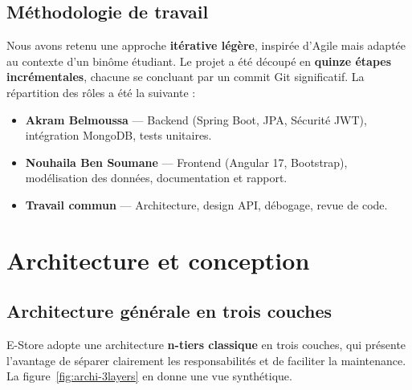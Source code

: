 \documentclass[11pt,a4paper,oneside]{report}
\begin{document}
\section{Méthodologie de travail}

Nous avons retenu une approche \textbf{itérative légère}, inspirée d'Agile
mais adaptée au contexte d'un binôme étudiant. Le projet a été découpé en
\textbf{quinze étapes incrémentales}, chacune se concluant par un commit
Git significatif. La répartition des rôles a été la suivante :

\begin{itemize}
  \item \textbf{Akram Belmoussa} — Backend (Spring Boot, JPA, Sécurité JWT),
    intégration MongoDB, tests unitaires.
  \item \textbf{Nouhaila Ben Soumane} — Frontend (Angular 17, Bootstrap),
    modélisation des données, documentation et rapport.
  \item \textbf{Travail commun} — Architecture, design API, débogage,
    revue de code.
\end{itemize}

\chapter{Architecture et conception}

\section{Architecture générale en trois couches}

E-Store adopte une architecture \textbf{n-tiers classique} en trois couches,
qui présente l'avantage de séparer clairement les responsabilités et de
faciliter la maintenance. La figure~\ref{fig:archi-3layers} en donne une
vue synthétique.
\end{document}
